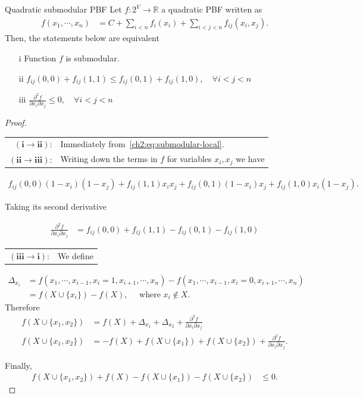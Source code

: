 \begin{proposition}{Quadratic submodular PBF}
	Let $f:2^V\rightarrow \mathbb{R}$ a quadratic PBF  written as
	\begin{align*}
		f(x_1,\cdots,x_n) &= C + \sum_{i<n}{f_{i}(x_i)} + \sum_{i<j<n}{f_{ij}(x_i,x_j)}.
	\end{align*}
	Then, the statements below are equivalent
	\begin{itemize}
	 	\item[i]{Function $f$ is submodular.}
		\item[ii]{ $f_{ij}(0,0) + f_{ij}(1,1) \leq f_{ij}(0,1) + f_{ij}(1,0), \quad \forall i<j<n$}
		\item[iii]{ $\frac{\partial^2 f}{\partial x_i\partial x_j} \leq 0, \quad \forall i<j<n$ }
	\end{itemize}
	\begin{proof}
	
	\begin{tabular}{rl}
	$\mathbf{(i\rightarrow ii)}$:& Immediately from~\cref{ch2:eq:submodular-local}. \\	
	$\mathbf{(ii\rightarrow iii)}$:&  Writing down the terms in $f$ for variables $x_i,x_j$ we have
	\end{tabular}
	
	\begin{align*}
		f_{ij}(0,0)(1-x_i)(1-x_j) + f_{ij}(1,1)x_ix_j + f_{ij}(0,1)(1-x_i)x_j + f_{ij}(1,0)x_i(1-x_j).
	\end{align*}

	Taking its second derivative

	\begin{align*}
		\frac{\partial^2f}{\partial x_i\partial x_j} &= f_{ij}(0,0) + f_{ij}(1,1) - f_{ij}(0,1) - f_{ij}(1,0)
	\end{align*}
	
	\begin{tabular}{rl}
		$\mathbf{(iii\rightarrow i)}$:& We define
	\end{tabular}		
	
		\begin{align*}
			\Delta_{x_i} &= f(x_1,\cdots,x_{i-1},x_i=1,x_{i+1},\cdots,x_n) - f(x_1,\cdots,x_{i-1},x_i=0,x_{i+1},\cdots,x_n) \\
			&= f(X \cup \{x_i\}) - f(X), \quad \text{ where } x_i \notin X.
		\end{align*}		 		
		Therefore
		\begin{align*}
			f( X \cup \{x_1,x_2\}) &= f(X) + \Delta_{x_1} + \Delta_{x_2} + \frac{ \partial^2 f}{\partial x_i \partial x_j} \\
			f( X \cup \{x_1,x_2\}) &= -f(X) + f(X \cup \{x_1\}) + f(X \cup \{x_2\}) + \frac{ \partial^2 f}{\partial x_i \partial x_j}.
		\end{align*}	
		
		Finally,
		\begin{align*}
			f( X \cup \{x_1,x_2\}) +f(X) - f(X \cup \{x_1\}) - f(X \cup \{x_2\}) &\leq 0.	
		\end{align*}
		
	\end{proof}
\end{proposition}





